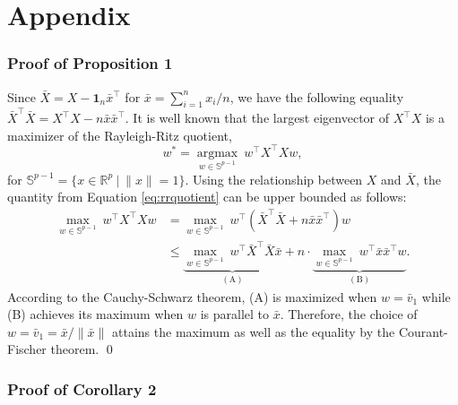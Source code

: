 \documentclass[11pt]{article}
\DeclareMathOperator*{\argmax}{argmax}
\newcommand{\bbR}{\mathbb{R}}
\newcommand{\bbS}{\mathbb{S}}
\newcommand{\bfone}{\mathbf{1}}
\begin{document}



\pagebreak
\section*{Appendix}\label{sec:proof}

\subsubsection*{Proof of Proposition 1}

Since $\bar{X} = X - \bfone_n \bar{x}^\top$ for $\bar{x} = \sum_{i=1}^n x_i /n$, we have the following equality $\bar{X}^\top \bar{X} = X^\top X - n \bar{x} \bar{x}^\top$. It is well known that the largest eigenvector of $X^\top X$ is a maximizer of the Rayleigh-Ritz quotient,
\begin{equation}\label{eq:rrquotient}
	w^* = \underset{w \in \bbS^{p-1}}{\argmax}~ w^\top X^\top X w,
\end{equation}
for $\bbS^{p-1} = \lbrace x\in\bbR^p~|~\|x\|=1\rbrace$. Using the relationship between $X$ and $\bar{X}$, the quantity from Equation \eqref{eq:rrquotient} can be upper bounded as follows:
\begin{align*}
	\underset{w \in \bbS^{p-1}}{\max}~ w^\top X^\top Xw &= \underset{w \in \bbS^{p-1}}{\max}~w^\top \left(\bar{X}^\top \bar{X} + n \bar{x} \bar{x}^\top\right)w\\
	&\leq \underbrace{\underset{w \in \bbS^{p-1}}{\max}~ w^\top \bar{X}^\top \bar{X} \bar{x}}_{(\textrm{A})}
	 + n \cdot \underbrace{\underset{w \in \bbS^{p-1}}{\max}~ w^\top \bar{x}\bar{x}^\top w}_{(\textrm{B})}.
\end{align*}
According to the Cauchy-Schwarz theorem, (A) is maximized when $w = \bar{v}_1$ while (B) achieves its maximum when $w$ is parallel to $\bar{x}$. Therefore, the choice of $w=\bar{v}_1 = \bar{x}/\|\bar{x}\|$ attains the maximum as well as the equality by the Courant-Fischer theorem. \qed

\subsubsection*{Proof of Corollary 2}
\end{document}
